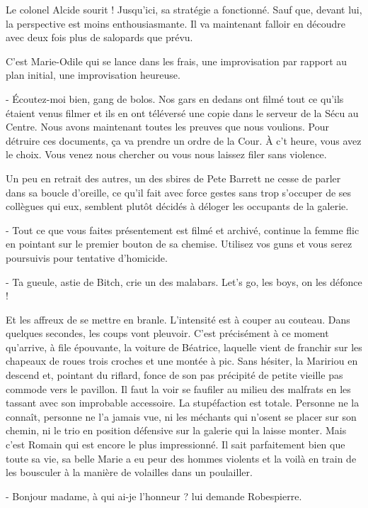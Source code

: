 Le colonel Alcide sourit ! Jusqu’ici, sa stratégie a fonctionné. Sauf que, devant lui, la perspective est moins enthousiasmante. Il va maintenant falloir en découdre avec deux fois plus de salopards que prévu.

C’est Marie-Odile qui se lance dans les frais, une improvisation par rapport au plan initial, une improvisation heureuse.

- Écoutez-moi bien, gang de bolos. Nos gars en dedans ont filmé tout ce qu’ils étaient venus filmer et ils en ont téléversé une copie dans le serveur de la Sécu au Centre. Nous avons maintenant toutes les preuves que nous voulions. Pour détruire ces documents, ça va prendre un ordre de la Cour. À c’t heure, vous avez le choix. Vous venez nous chercher ou vous nous laissez filer sans violence.

Un peu en retrait des autres, un des sbires de Pete Barrett ne cesse de parler dans sa boucle d’oreille, ce qu’il fait avec force gestes sans trop s’occuper de ses collègues qui eux, semblent plutôt décidés à déloger les occupants de la galerie.

- Tout ce que vous faites présentement est filmé et archivé, continue la femme flic en pointant sur le premier bouton de sa chemise. Utilisez vos guns et vous serez poursuivis pour tentative d’homicide.

- Ta gueule, astie de Bitch, crie un des malabars. Let’s go, les boys, on les défonce !

Et les affreux de se mettre en branle. L’intensité est à couper au couteau. Dans quelques secondes, les coups vont pleuvoir. C’est précisément à ce moment qu’arrive, à file épouvante, la voiture de Béatrice, laquelle vient de franchir sur les chapeaux de roues trois croches et une montée à pic. Sans hésiter, la Maririou en descend et, pointant du riflard, fonce de son pas précipité de petite vieille pas commode vers le pavillon. Il faut la voir se faufiler au milieu des malfrats en les tassant avec son improbable accessoire. La stupéfaction est totale. Personne ne la connaît, personne ne l’a jamais vue, ni les méchants qui n’osent se placer sur son chemin, ni le trio en position défensive sur la galerie qui la laisse monter. Mais c’est Romain qui est encore le plus impressionné. Il sait parfaitement bien que toute sa vie, sa belle Marie a eu peur des hommes violents et la voilà en train de les bousculer à la manière de volailles dans un poulailler.

- Bonjour madame, à qui ai-je l’honneur ? lui demande Robespierre.

